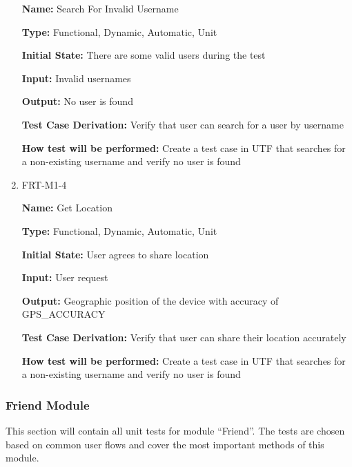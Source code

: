 \documentclass[12pt, titlepage]{article}
\begin{document}
\begin{enumerate}
\textbf{Name:} Search For Invalid Username

\textbf{Type:} Functional, Dynamic, Automatic, Unit
					
\textbf{Initial State:} There are some valid users during the test
					
\textbf{Input:} Invalid usernames
					
\textbf{Output:} No user is found

\textbf{Test Case Derivation:} Verify that user can search for a user by username

\textbf{How test will be performed:} Create a test case in UTF that searches for a non-existing username and verify no user is found

\item{FRT-M1-4}

\textbf{Name:} Get Location

\textbf{Type:} Functional, Dynamic, Automatic, Unit
					
\textbf{Initial State:} User agrees to share location
					
\textbf{Input:} User request
					
\textbf{Output:} Geographic position of the device with accuracy of GPS\_ACCURACY

\textbf{Test Case Derivation:} Verify that user can share their location accurately

\textbf{How test will be performed:} Create a test case in UTF that searches for a non-existing username and verify no user is found
\end{enumerate}

\subsubsection{Friend Module}

This section will contain all unit tests for module ``Friend''. The tests are chosen based on common user flows and cover the most important methods of this module.
\end{document}
